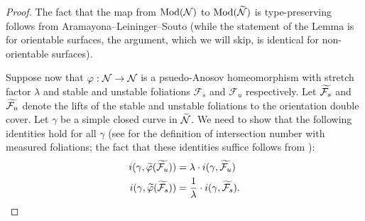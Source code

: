 \begin{proof}
  The fact that the map from $\operatorname{Mod}(\mathcal{N})$ to $\operatorname{Mod}(\widetilde{\mathcal{N}})$ is type-preserving follows from Aramayona--Leininger--Souto \cite[Lemma 10]{aramayona2009injections} (while the statement of the Lemma is for orientable surfaces, the argument, which we will skip, is identical for non-orientable surfaces).

  Suppose now that $\varphi:\mathcal{N}\rightarrow\mathcal{N}$ is a psuedo-Anosov homeomorphism with stretch factor $\lambda$ and stable and unstable foliations $\mathcal{F}_s$ and $\mathcal{F}_u$ respectively.
  Let $\widetilde{\mathcal{F}_s}$ and $\widetilde{\mathcal{F}_u}$ denote the lifts of the stable and unstable foliations to the orientation double cover.  Let $\gamma$ be a simple closed curve in $\widetilde{\mathcal{N}}$.
  We need to show that the following identities hold for all $\gamma$ (see \cite[Expos\'e 5]{FLP} for the definition of intersection number with measured foliations; the fact that these identities suffice follows from \cite[Lemma 9.15]{FLP}):
  \begin{align}
      \label{eq:unstable-foliation}
      i(\gamma, \widetilde{\varphi}(\widetilde{\mathcal{F}_u})) &= \lambda \cdot i(\gamma, \widetilde{\mathcal{F}_u}) \\
      \label{eq:stable-foliation}
      i(\gamma, \widetilde{\varphi}(\widetilde{\mathcal{F}_s})) &= \frac{1}{\lambda} \cdot i(\gamma, \widetilde{\mathcal{F}_s}).
  \end{align}


\end{proof}
